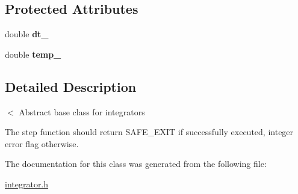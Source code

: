 \subsection*{Protected Attributes}
\begin{DoxyCompactItemize}
\item 
\hypertarget{classIntegrator_a26e3530cd1b2c3cf844d550b317568a9}{double {\bfseries dt\-\_\-}}\label{classIntegrator_a26e3530cd1b2c3cf844d550b317568a9}

\item 
\hypertarget{classIntegrator_a37fee941833e7d7d60c200d82160139f}{double {\bfseries temp\-\_\-}}\label{classIntegrator_a37fee941833e7d7d60c200d82160139f}

\end{DoxyCompactItemize}


\subsection{Detailed Description}
$<$ Abstract base class for integrators 

The step function should return S\-A\-F\-E\-\_\-\-E\-X\-I\-T if successfully executed, integer error flag otherwise. 

The documentation for this class was generated from the following file\-:\begin{DoxyCompactItemize}
\item 
\hyperlink{integrator_8h}{integrator.\-h}\end{DoxyCompactItemize}
